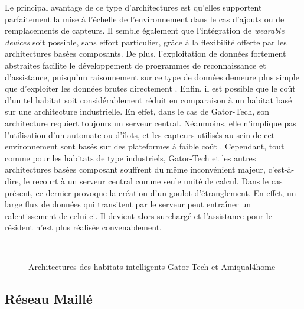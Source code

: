 Le principal avantage de ce type d'architectures est qu'elles supportent parfaitement la mise à l'échelle de l'environnement dans le cas d'ajouts ou de remplacements de capteurs. Il semble également que l'intégration de \textit{wearable devices} soit possible, sans effort particulier, grâce à la flexibilité offerte par les architectures basées composants. De plus, l'exploitation de données fortement abstraites facilite le développement de programmes de reconnaissance et d'assistance, puisqu'un raisonnement sur ce type de données demeure plus simple que d'exploiter les données brutes directement \citep{Helal2005}. Enfin, il est possible que le coût d'un tel habitat soit considérablement réduit en comparaison à un habitat basé sur une architecture industrielle. En effet, dans le cas de Gator-Tech, son architecture requiert toujours un serveur central. Néanmoins, elle n'implique pas l'utilisation d'un automate ou d'îlots, et les capteurs utilisés au sein de cet environnement sont basés sur des plateformes à faible coût \citep{Helal2005}. Cependant, tout comme pour les habitats de type industriels, Gator-Tech et les autres architectures basées composant souffrent du même inconvénient majeur, c'est-à-dire, le recourt à un serveur central comme seule unité de calcul. Dans le cas présent, ce dernier provoque la création d'un goulot d'étranglement. En effet, un large flux de données qui transitent par le serveur peut entraîner un ralentissement de celui-ci. Il devient alors surchargé et l'assistance pour le résident n'est plus réalisée convenablement.

\begin{figure}[H]
	\centering
	\\[20pt]
	\caption{Architectures des habitats intelligents Gator-Tech et Amiqual4home}
\end{figure}

\subsection{Réseau Maillé}


